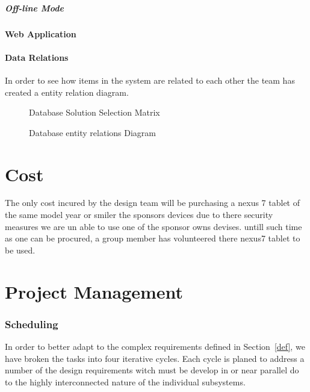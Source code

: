 \documentclass[Letter,11pt]{article}
\begin{document}
	\subsubsection{Off-line Mode}
	
	\subsection{Web Application}
	
	\subsection{Data Relations}
		In order to see how items in the system are related to each other the team has created a entity relation diagram. 
		\begin{figure}[h]
			\centering
			
			\caption{\label{DBMatrix} Database Solution Selection Matrix}
		\end{figure}
		
		\begin{figure}[h]
			\centering
			
			\caption{\label{ERdiogram} Database entity relations Diagram}
		\end{figure}
	
		
		
	
\part{Cost}
The only cost incured by the design team will be purchasing a nexus 7 tablet of the same model year or smiler the sponsors devices due to there security measures we are un able to use one of the sponsor owns devises. untill such time as one can be procured, a group member has volunteered there nexus7 tablet to be used.
\part{Project Management}
\section{Scheduling}
		In order to better adapt to the complex requirements defined in Section~\ref{def}, we have broken the tasks into four iterative cycles. Each cycle is planed to address a number of the design requirements witch must be develop in or near parallel do to the highly interconnected nature of the individual subsystems. 
		
\end{document}
